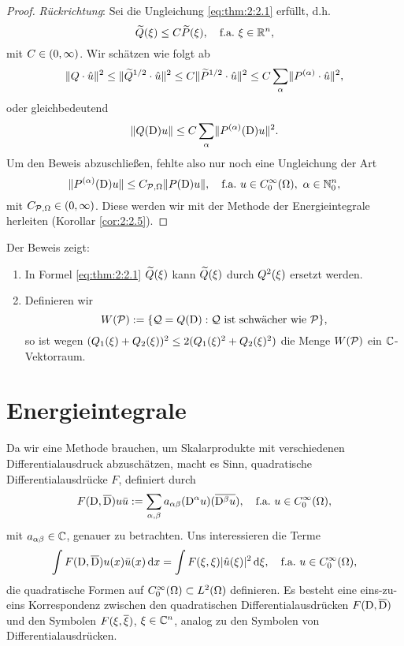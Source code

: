 \begin{proof}
{\em Rückrichtung}:
Sei die Ungleichung \eqref{eq:thm:2:2.1} erfüllt, d.h.
\begin{equation}\label{eq:2.10}
\widetilde{Q}(\xi)\leq C\widetilde{P}(\xi),
\quad\text{f.a.}~\xi\in\mathbb R^n,
\end{equation}
mit $C\in(0,\infty)$.
Wir schätzen wie folgt ab
\begin{equation}
\lVert Q\cdot\hat{u}\rVert^2\leq\lVert\widetilde{Q}^{1/2}\cdot\hat{u}\rVert^2
\leq C\lVert\widetilde{P}^{1/2}\cdot\hat{u}\rVert^2\leq C\sum_\alpha\lVert P^{(\alpha)}\cdot\hat{u}\rVert^2,
\end{equation}
oder gleichbedeutend
\begin{equation}
\lVert Q(\mathrm D)u\rVert\leq C\sum_\alpha\lVert P^{(\alpha)}(\mathrm D)u\rVert^2.\label{eq:2.11}
\end{equation}
Um den Beweis abzuschließen,
fehlte also nur noch eine Ungleichung der Art
\begin{equation}
\lVert P^{(\alpha)}(\mathrm D)u\rVert\leq C_{\mathcal P,\Omega}\lVert P(\mathrm D)u\rVert,
\quad\text{f.a.}~u\in C^\infty_0(\Omega),~\alpha\in\mathbb N^n_0,\label{eq:2:wantedineq}
\end{equation}
mit $C_{\mathcal P,\Omega}\in(0,\infty)$.
Diese werden wir mit der Methode der Energieintegrale herleiten (Korollar \ref{cor:2:2.5}).
\end{proof}

\begin{rem}
Der Beweis zeigt:
\begin{enumerate}
\item
In Formel \eqref{eq:thm:2:2.1} $\widetilde{Q}(\xi)$ kann $\widetilde{Q}(\xi)$
durch $Q^2(\xi)$ ersetzt werden.
\item
Definieren wir
\begin{equation}
W(\mathcal P):=\{\mathcal Q=Q(\mathrm D):\mathcal Q~\text{ist schwächer wie}~\mathcal P\},
\end{equation}
so ist wegen $(Q_1(\xi)+Q_2(\xi))^2\leq2(Q_1(\xi)^2+Q_2(\xi)^2)$
die Menge $W(\mathcal P)$ ein $\mathbb C$-Vektorraum.
\end{enumerate}

\end{rem}

\section{Energieintegrale}

Da wir eine Methode brauchen,
um Skalarprodukte mit verschiedenen Differentialausdruck abzuschätzen,
macht es Sinn, quadratische Differentialausdrücke $F$, definiert durch
\begin{equation}
F(\mathrm D,\overline{\mathrm D})u\bar{u}
:=\sum_{\alpha,\beta}a_{\alpha\beta}(\mathrm D^\alpha u)(\overline{\mathrm D^\beta u}),
\quad\text{f.a.}~u\in C^\infty_0(\Omega),
\end{equation}
mit $a_{\alpha\beta}\in\mathbb C$, genauer zu betrachten.
Uns interessieren die Terme
\begin{equation}\label{eq:2:qf}
\int F(\mathrm D,\overline{\mathrm D})u(x)\bar{u}(x)\,\mathrm d x
=\int F(\xi,\xi)\lvert\hat{u}(\xi)\rvert^2\,\mathrm d \xi,
\quad\text{f.a.}~u\in C^\infty_0(\Omega),
\end{equation}
die quadratische Formen auf $C^\infty_0(\Omega)\subset L^2(\Omega)$
definieren.
Es besteht eine eins-zu-eins Korrespondenz
zwischen den quadratischen Differentialausdrücken $F(\mathrm D,\overline{\mathrm D})$
und den Symbolen $F(\xi,\overline{\xi})$, $\xi\in\mathbb C^n$,
analog zu den Symbolen von Differentialausdrücken.

